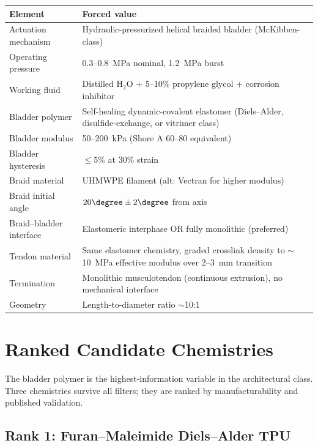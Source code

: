\documentclass[11pt, a4paper]{article}
\begin{document}
\begin{center}
\begin{tabular}{@{}lp{9cm}@{}}
\toprule
\textbf{Element} & \textbf{Forced value} \\
\midrule
Actuation mechanism & Hydraulic-pressurized helical braided bladder
  (McKibben-class) \\
Operating pressure & 0.3--0.8~MPa nominal, 1.2~MPa burst \\
Working fluid & Distilled H$_2$O + 5--10\% propylene glycol +
  corrosion inhibitor \\
Bladder polymer & Self-healing dynamic-covalent elastomer
  (Diels--Alder, disulfide-exchange, or vitrimer class) \\
Bladder modulus & 50--200~kPa (Shore A 60--80 equivalent) \\
Bladder hysteresis & $\leq 5\%$ at 30\% strain \\
Braid material & UHMWPE filament (alt: Vectran for higher
  modulus) \\
Braid initial angle & $20\degree \pm 2\degree$ from axis \\
Braid--bladder interface & Elastomeric interphase OR fully
  monolithic (preferred) \\
Tendon material & Same elastomer chemistry, graded crosslink
  density to $\sim$10~MPa effective modulus over 2--3~mm
  transition \\
Termination & Monolithic musculotendon (continuous extrusion),
  no mechanical interface \\
Geometry & Length-to-diameter ratio $\sim$10:1 \\
\bottomrule
\end{tabular}
\end{center}

\section{Ranked Candidate Chemistries}

The bladder polymer is the highest-information variable in the
architectural class. Three chemistries survive all filters; they
are ranked by manufacturability and published validation.

\subsection{Rank 1: Furan--Maleimide Diels--Alder TPU}
\end{document}
